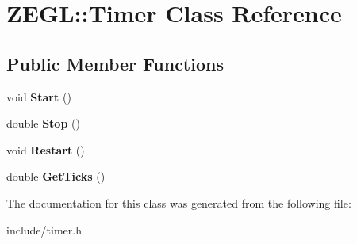 \hypertarget{class_z_e_g_l_1_1_timer}{}\section{Z\+E\+G\+L\+:\+:Timer Class Reference}
\label{class_z_e_g_l_1_1_timer}
\subsection*{Public Member Functions}
\begin{DoxyCompactItemize}
\item 
\hypertarget{class_z_e_g_l_1_1_timer_ab9ebe5f7765d5c0cc2644e5f575cd0b1}{}void {\bfseries Start} ()\label{class_z_e_g_l_1_1_timer_ab9ebe5f7765d5c0cc2644e5f575cd0b1}

\item 
\hypertarget{class_z_e_g_l_1_1_timer_a3a25a38b5ae28e4980cf7e0895c6f340}{}double {\bfseries Stop} ()\label{class_z_e_g_l_1_1_timer_a3a25a38b5ae28e4980cf7e0895c6f340}

\item 
\hypertarget{class_z_e_g_l_1_1_timer_a05e1d44ab7862a07008d702e32dd851e}{}void {\bfseries Restart} ()\label{class_z_e_g_l_1_1_timer_a05e1d44ab7862a07008d702e32dd851e}

\item 
\hypertarget{class_z_e_g_l_1_1_timer_af413f2b09ec51549c933d3ab5ec7437d}{}double {\bfseries Get\+Ticks} ()\label{class_z_e_g_l_1_1_timer_af413f2b09ec51549c933d3ab5ec7437d}

\end{DoxyCompactItemize}


The documentation for this class was generated from the following file\+:\begin{DoxyCompactItemize}
\item 
include/timer.\+h\end{DoxyCompactItemize}
